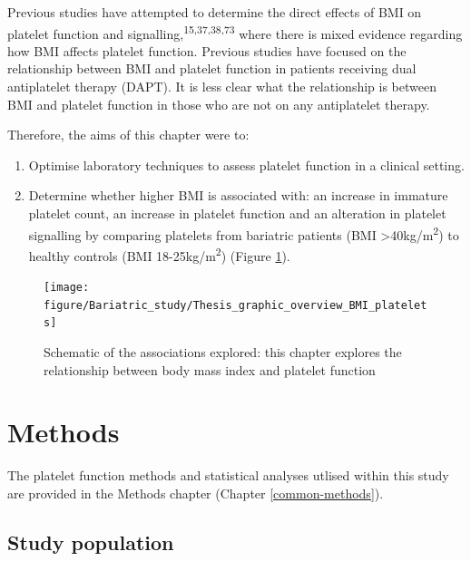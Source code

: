\documentclass[11pt,twoside]{bristolthesis}
\providecommand{\tightlist}{%
  \setlength{\itemsep}{0pt}\setlength{\parskip}{0pt}}
\begin{document}
Previous studies have attempted to determine the direct effects of BMI on platelet function and signalling,\textsuperscript{15,37,38,73} where there is mixed evidence regarding how BMI affects platelet function. Previous studies have focused on the relationship between BMI and platelet function in patients receiving dual antiplatelet therapy (DAPT). It is less clear what the relationship is between BMI and platelet function in those who are not on any antiplatelet therapy.

Therefore, the aims of this chapter were to:
\begin{enumerate}
\def\labelenumi{\arabic{enumi})}
\tightlist
\item
  Optimise laboratory techniques to assess platelet function in a clinical setting.
\item
  Determine whether higher BMI is associated with: an increase in immature platelet count, an increase in platelet function and an alteration in platelet signalling by comparing platelets from bariatric patients (BMI \textgreater40kg/m\textsuperscript{2}) to healthy controls (BMI 18-25kg/m\textsuperscript{2}) (Figure \ref{fig:BMI-platelet-overview2}).
\end{enumerate}
\begin{figure}
\texttt{[image: figure/Bariatric\_study/Thesis\_graphic\_overview\_BMI\_platelets]} \caption[Schematic of the associations explored in the current chapter]{Schematic of the associations explored: this chapter explores the relationship between body mass index and platelet function}\label{fig:BMI-platelet-overview2}
\end{figure}
\hypertarget{methods-1}{%
\section{Methods}\label{methods-1}}

The platelet function methods and statistical analyses utlised within this study are provided in the Methods chapter (Chapter \ref{common-methods}).

\hypertarget{study-population-1}{%
\subsection{Study population}\label{study-population-1}}
\end{document}

